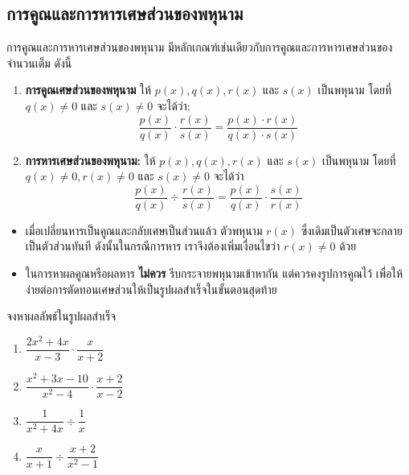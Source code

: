 \subsection{การคูณและการหารเศษส่วนของพหุนาม}
การคูณและการหารเศษส่วนของพหุนาม มีหลักเกณฑ์เช่นเดียวกับการคูณและการหารเศษส่วนของจำนวนเต็ม ดังนี้
\begin{conceptbox}
	\begin{enumerate}[label=\arabic*., leftmargin=2.5em]
		\item \textbf{การคูณเศษส่วนของพหุนาม} 
		ให้ $p(x), q(x), r(x)$ และ $s(x)$ เป็นพหุนาม โดยที่ $q(x) \neq 0$ และ $s(x) \neq 0$ จะได้ว่า:
		\[ \dfrac{p(x)}{q(x)} \cdot \dfrac{r(x)}{s(x)} = \dfrac{p(x) \cdot r(x)}{q(x) \cdot s(x)} \]
		
		\item \textbf{การหารเศษส่วนของพหุนาม:} 
		ให้ $p(x), q(x), r(x)$ และ $s(x)$ เป็นพหุนาม โดยที่ $q(x) \neq 0, r(x) \neq 0$ และ $s(x) \neq 0$ จะได้ว่า
		\[ \dfrac{p(x)}{q(x)} \div \dfrac{r(x)}{s(x)} = \dfrac{p(x)}{q(x)} \cdot \dfrac{s(x)}{r(x)} \]
	\end{enumerate}
\end{conceptbox}

\warning
\begin{itemize}
	\item  เมื่อเปลี่ยนหารเป็นคูณและกลับเศษเป็นส่วนแล้ว ตัวพหุนาม $r(x)$ ซึ่งเดิมเป็นตัวเศษจะกลายเป็นตัวส่วนทันที ดังนั้นในกรณีการหาร เราจึงต้องเพิ่มเงื่อนไขว่า $r(x) \neq 0$ ด้วย
	
	\item ในการหาผลคูณหรือผลหาร \textbf{ไม่ควร} รีบกระจายพหุนามเข้าหากัน แต่ควรคงรูปการคูณไว้ เพื่อให้ง่ายต่อการตัดทอนเศษส่วนให้เป็นรูปผลสำเร็จในขั้นตอนสุดท้าย
\end{itemize}

\newpage
\begin{examplebox}
	จงหาผลลัพธ์ในรูปผลสำเร็จ
	\begin{enumerate}[label=\arabic*), leftmargin=2.5em]
		\item $\dfrac{2x^2+4x}{x-3} \cdot \dfrac{x}{x+2}$
		\item $\dfrac{x^2+3x-10}{x^2-4} \cdot \dfrac{x+2}{x-2}$
		\item $\dfrac{1}{x^2+4x} \div \dfrac{1}{x}$
		\item $\dfrac{x}{x+1} \div \dfrac{x+2}{x^2-1}$
	\end{enumerate}  
\end{examplebox}
\solution


\newpage
